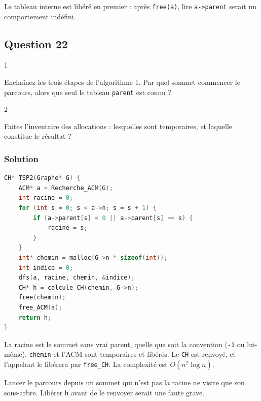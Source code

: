 \documentclass[11pt,a4paper]{article}
\begin{document}
Le tableau interne est libéré en premier : après \texttt{free(a)}, lire \texttt{a-\textgreater{}parent} serait un comportement indéfini.

\hypertarget{question-22}{%
\subsection{Question 22}\label{question-22}}

\begin{indication}{1}

Enchaînez les trois étapes de l'algorithme 1. Par quel sommet commencer le parcours, alors que seul le tableau \texttt{parent} est connu ?

\end{indication}

\begin{indication}{2}

Faites l'inventaire des allocations : lesquelles sont temporaires, et laquelle constitue le résultat ?

\end{indication}

\hypertarget{solution-21}{%
\subsubsection{Solution}\label{solution-21}}

\begin{lstlisting}[language=C]
CH* TSP2(Graphe* G) {
    ACM* a = Recherche_ACM(G);
    int racine = 0;
    for (int s = 0; s < a->n; s = s + 1) {
        if (a->parent[s] < 0 || a->parent[s] == s) {
            racine = s;
        }
    }
    int* chemin = malloc(G->n * sizeof(int));
    int indice = 0;
    dfs(a, racine, chemin, &indice);
    CH* h = calcule_CH(chemin, G->n);
    free(chemin);
    free_ACM(a);
    return h;
}
\end{lstlisting}

La racine est le sommet sans vrai parent, quelle que soit la convention (\texttt{-1} ou lui-même). \texttt{chemin} et l'ACM sont temporaires et libérés. Le \texttt{CH} est renvoyé, et l'appelant le libérera par \texttt{free\_CH}. La complexité est \(O(n^2\log n)\).

\begin{piege}

Lancer le parcours depuis un sommet qui n'est pas la racine ne visite que son sous-arbre. Libérer \texttt{h} avant de le renvoyer serait une faute grave.

\end{piege}
\end{document}
